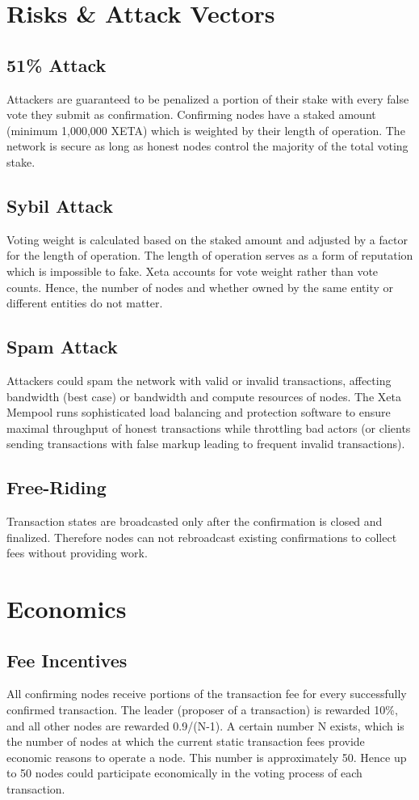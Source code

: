 \documentclass{article}
\begin{document}
\section{Risks \& Attack Vectors}
\subsection{51\% Attack}
Attackers are guaranteed to be penalized a portion of their stake with every false vote they submit as confirmation. Confirming nodes have a staked amount (minimum 1,000,000 XETA) which is weighted by their length of operation. The network is secure as long as honest nodes control the majority of the total voting stake.

\subsection{Sybil Attack}
Voting weight is calculated based on the staked amount and adjusted by a factor for the length of operation. The length of operation serves as a form of reputation which is impossible to fake. Xeta accounts for vote weight rather than vote counts. Hence, the number of nodes and whether owned by the same entity or different entities do not matter.

\subsection{Spam Attack}
Attackers could spam the network with valid or invalid transactions, affecting bandwidth (best case) or bandwidth and compute resources of nodes. The Xeta Mempool runs sophisticated load balancing and protection software to ensure maximal throughput of honest transactions while throttling bad actors (or clients sending transactions with false markup leading to frequent invalid transactions).

\subsection{Free-Riding}
Transaction states are broadcasted only after the confirmation is closed and finalized. Therefore nodes can not rebroadcast existing confirmations to collect fees without providing work.

\section{Economics}
\subsection{Fee Incentives}
All confirming nodes receive portions of the transaction fee for every successfully confirmed transaction. The leader (proposer of a transaction) is rewarded 10\%, and all other nodes are rewarded 0.9/(N-1). A certain number N exists, which is the number of nodes at which the current static transaction fees provide economic reasons to operate a node. This number is approximately 50. Hence up to 50 nodes could participate economically in the voting process of each transaction.
\bigskip
\end{document}
